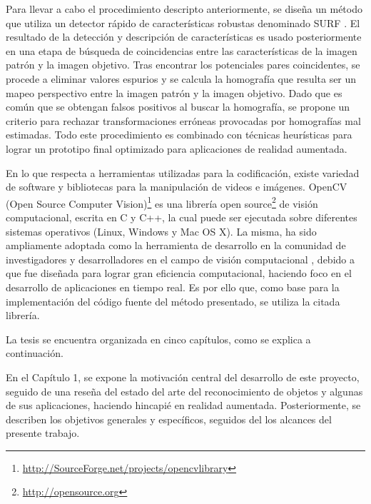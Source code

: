 Para llevar a cabo el procedimiento descripto anteriormente, se diseña un método que utiliza un detector rápido de características robustas denominado SURF \cite{Bay:2008:SRF}. El resultado de la detección y descripción de características es usado posteriormente en una etapa de búsqueda de coincidencias entre las características de la imagen patrón y la imagen objetivo. Tras encontrar los potenciales pares coincidentes, se procede a eliminar valores espurios y se calcula la homografía que resulta ser un mapeo perspectivo entre la imagen patrón y la imagen objetivo. Dado que es común que se obtengan falsos positivos al buscar la homografía, se propone un criterio para rechazar transformaciones erróneas provocadas por homografías mal estimadas. Todo este procedimiento es combinado con técnicas heurísticas para lograr un prototipo final optimizado para aplicaciones de realidad aumentada.

En lo que respecta a herramientas utilizadas para la codificación, existe variedad de software y bibliotecas para la manipulación de videos e imágenes. OpenCV (Open Source Computer Vision)\footnote[1]{\url{http://SourceForge.net/projects/opencvlibrary}} es una librería open source\footnote[2]{\url{http://opensource.org}} de visión computacional, escrita en C y C++, la cual puede ser ejecutada sobre diferentes sistemas operativos (Linux, Windows y Mac OS X). La misma, ha sido ampliamente adoptada como la herramienta de desarrollo en la comunidad de investigadores y desarrolladores en el campo de visión computacional \cite{citeulike:9456628}, debido a que fue diseñada para lograr gran eficiencia computacional, haciendo foco en el desarrollo de aplicaciones en tiempo real. Es por ello que, como base para la implementación del código fuente del método presentado, se utiliza la citada librería.

La tesis se encuentra organizada en cinco capítulos, como se explica a continuación.

En el Capítulo 1, se expone la motivación central del desarrollo de este proyecto, seguido de una reseña del estado del arte del reconocimiento de objetos y algunas de sus aplicaciones, haciendo hincapié en realidad aumentada. Posteriormente, se describen los objetivos generales y específicos, seguidos del los alcances del presente trabajo.


